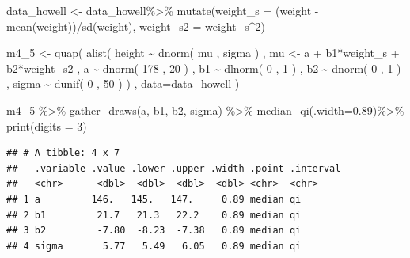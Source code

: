 \documentclass[
]{book}
\newenvironment{Shaded}{\begin{snugshade}}{\end{snugshade}}
\newcommand{\AttributeTok}[1]{\textcolor[rgb]{0.77,0.63,0.00}{#1}}
\newcommand{\DecValTok}[1]{\textcolor[rgb]{0.00,0.00,0.81}{#1}}
\newcommand{\FloatTok}[1]{\textcolor[rgb]{0.00,0.00,0.81}{#1}}
\newcommand{\FunctionTok}[1]{\textcolor[rgb]{0.00,0.00,0.00}{#1}}
\newcommand{\NormalTok}[1]{#1}
\newcommand{\OtherTok}[1]{\textcolor[rgb]{0.56,0.35,0.01}{#1}}
\newcommand{\SpecialCharTok}[1]{\textcolor[rgb]{0.00,0.00,0.00}{#1}}
\begin{document}
\begin{Shaded}
\begin{Highlighting}[]
\NormalTok{data\_howell }\OtherTok{\textless{}{-}}\NormalTok{ data\_howell}\SpecialCharTok{\%\textgreater{}\%}
  \FunctionTok{mutate}\NormalTok{(}\AttributeTok{weight\_s =}\NormalTok{ (weight }\SpecialCharTok{{-}} \FunctionTok{mean}\NormalTok{(weight))}\SpecialCharTok{/}\FunctionTok{sd}\NormalTok{(weight),}
         \AttributeTok{weight\_s2 =}\NormalTok{ weight\_s}\SpecialCharTok{\^{}}\DecValTok{2}\NormalTok{)}

\NormalTok{m4\_5 }\OtherTok{\textless{}{-}} \FunctionTok{quap}\NormalTok{(}
    \FunctionTok{alist}\NormalTok{(}
\NormalTok{        height }\SpecialCharTok{\textasciitilde{}} \FunctionTok{dnorm}\NormalTok{( mu , sigma ) ,}
\NormalTok{        mu }\OtherTok{\textless{}{-}}\NormalTok{ a }\SpecialCharTok{+}\NormalTok{ b1}\SpecialCharTok{*}\NormalTok{weight\_s }\SpecialCharTok{+}\NormalTok{ b2}\SpecialCharTok{*}\NormalTok{weight\_s2 ,}
\NormalTok{        a }\SpecialCharTok{\textasciitilde{}} \FunctionTok{dnorm}\NormalTok{( }\DecValTok{178}\NormalTok{ , }\DecValTok{20}\NormalTok{ ) ,}
\NormalTok{        b1 }\SpecialCharTok{\textasciitilde{}} \FunctionTok{dlnorm}\NormalTok{( }\DecValTok{0}\NormalTok{ , }\DecValTok{1}\NormalTok{ ) ,}
\NormalTok{        b2 }\SpecialCharTok{\textasciitilde{}} \FunctionTok{dnorm}\NormalTok{( }\DecValTok{0}\NormalTok{ , }\DecValTok{1}\NormalTok{ ) ,}
\NormalTok{        sigma }\SpecialCharTok{\textasciitilde{}} \FunctionTok{dunif}\NormalTok{( }\DecValTok{0}\NormalTok{ , }\DecValTok{50}\NormalTok{ )}
\NormalTok{    ) , }\AttributeTok{data=}\NormalTok{data\_howell )}

\NormalTok{m4\_5 }\SpecialCharTok{\%\textgreater{}\%}
  \FunctionTok{gather\_draws}\NormalTok{(a, b1, b2, sigma) }\SpecialCharTok{\%\textgreater{}\%}
  \FunctionTok{median\_qi}\NormalTok{(}\AttributeTok{.width=}\FloatTok{0.89}\NormalTok{)}\SpecialCharTok{\%\textgreater{}\%}
  \FunctionTok{print}\NormalTok{(}\AttributeTok{digits =} \DecValTok{3}\NormalTok{)}
\end{Highlighting}
\end{Shaded}

\begin{verbatim}
## # A tibble: 4 x 7
##   .variable .value .lower .upper .width .point .interval
##   <chr>      <dbl>  <dbl>  <dbl>  <dbl> <chr>  <chr>    
## 1 a         146.   145.   147.     0.89 median qi       
## 2 b1         21.7   21.3   22.2    0.89 median qi       
## 3 b2         -7.80  -8.23  -7.38   0.89 median qi       
## 4 sigma       5.77   5.49   6.05   0.89 median qi
\end{verbatim}
\end{document}
